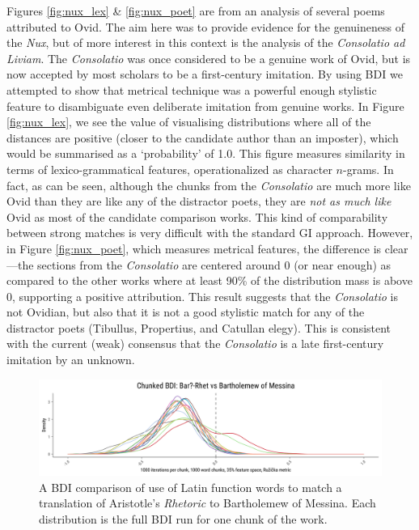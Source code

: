 \documentclass[
    hf
]{ceurart}
\begin{document}
Figures \ref{fig:nux_lex} \& \ref{fig:nux_poet} are from an analysis of several poems attributed to
Ovid. The aim here was to provide evidence for the genuineness of the \emph{Nux}, but of more
interest in this context is the analysis of the \emph{Consolatio ad Liviam}. The \emph{Consolatio}
was once considered to be a genuine work of Ovid, but is now accepted by most scholars to be a
first-century imitation. By using BDI we attempted to show that metrical technique was a powerful
enough stylistic feature to disambiguate even deliberate imitation from genuine works. In Figure
\ref{fig:nux_lex}, we see the value of visualising distributions where all of the distances are
positive (closer to the candidate author than an imposter), which would be summarised as a
`probability' of 1.0. This figure measures similarity in terms of lexico-grammatical features,
operationalized as character $n$-grams. In fact, as can be seen, although the chunks from the
\emph{Consolatio} are much more like Ovid than they are like any of the distractor poets, they are
\emph{not as much like} Ovid as most of the candidate comparison works. This kind of comparability
between strong matches is very difficult with the standard GI approach. However, in Figure
\ref{fig:nux_poet}, which measures metrical features, the difference is clear---the sections from
the \emph{Consolatio} are centered around 0 (or near enough) as compared to the other works where at
least 90\% of the distribution mass is above 0, supporting a positive attribution. This result
suggests that the \emph{Consolatio} is not Ovidian, but also that it is not a good stylistic match
for any of the distractor poets (Tibullus, Propertius, and Catullan elegy). This is consistent with
the  current (weak) consensus that the \textit{Consolatio} is a late first-century imitation by an
unknown.

\begin{figure}
    \includegraphics[width=\linewidth]{images/bdi_bar_paper.png}
    \caption{A BDI comparison of use of Latin function words to match a
        translation of Aristotle's \emph{Rhetoric} to Bartholemew of Messina. Each
        distribution is the full BDI run for one chunk of the work.}
    \label{fig:trans_bar}
\end{figure}
\end{document}
